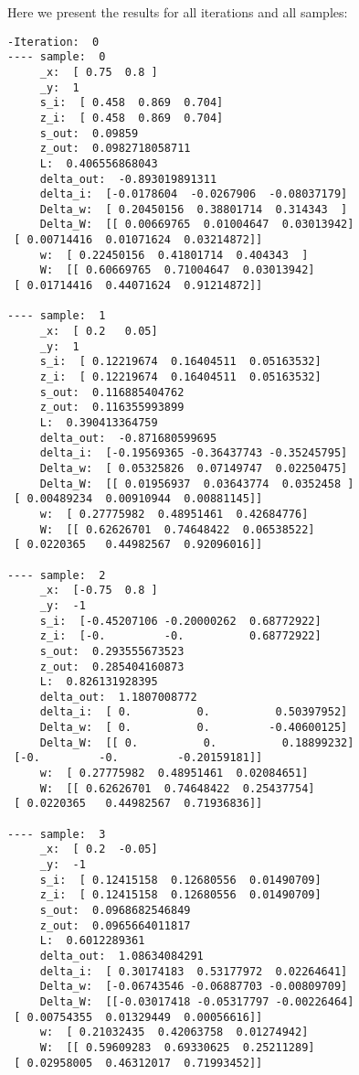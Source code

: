 \documentclass[10pt]{article}
\begin{document}
Here we present the results for all iterations and all samples:
\begin{multicols}{3}
\begin{tiny}
\begin{verbatim}
-Iteration:  0
---- sample:  0
     _x:  [ 0.75  0.8 ]
     _y:  1
     s_i:  [ 0.458  0.869  0.704]
     z_i:  [ 0.458  0.869  0.704]
     s_out:  0.09859
     z_out:  0.0982718058711
     L:  0.406556868043
     delta_out:  -0.893019891311
     delta_i:  [-0.0178604  -0.0267906  -0.08037179]
     Delta_w:  [ 0.20450156  0.38801714  0.314343  ]
     Delta_W:  [[ 0.00669765  0.01004647  0.03013942]
 [ 0.00714416  0.01071624  0.03214872]]
     w:  [ 0.22450156  0.41801714  0.404343  ]
     W:  [[ 0.60669765  0.71004647  0.03013942]
 [ 0.01714416  0.44071624  0.91214872]]

---- sample:  1
     _x:  [ 0.2   0.05]
     _y:  1
     s_i:  [ 0.12219674  0.16404511  0.05163532]
     z_i:  [ 0.12219674  0.16404511  0.05163532]
     s_out:  0.116885404762
     z_out:  0.116355993899
     L:  0.390413364759
     delta_out:  -0.871680599695
     delta_i:  [-0.19569365 -0.36437743 -0.35245795]
     Delta_w:  [ 0.05325826  0.07149747  0.02250475]
     Delta_W:  [[ 0.01956937  0.03643774  0.0352458 ]
 [ 0.00489234  0.00910944  0.00881145]]
     w:  [ 0.27775982  0.48951461  0.42684776]
     W:  [[ 0.62626701  0.74648422  0.06538522]
 [ 0.0220365   0.44982567  0.92096016]]

---- sample:  2
     _x:  [-0.75  0.8 ]
     _y:  -1
     s_i:  [-0.45207106 -0.20000262  0.68772922]
     z_i:  [-0.         -0.          0.68772922]
     s_out:  0.293555673523
     z_out:  0.285404160873
     L:  0.826131928395
     delta_out:  1.1807008772
     delta_i:  [ 0.          0.          0.50397952]
     Delta_w:  [ 0.          0.         -0.40600125]
     Delta_W:  [[ 0.          0.          0.18899232]
 [-0.         -0.         -0.20159181]]
     w:  [ 0.27775982  0.48951461  0.02084651]
     W:  [[ 0.62626701  0.74648422  0.25437754]
 [ 0.0220365   0.44982567  0.71936836]]

---- sample:  3
     _x:  [ 0.2  -0.05]
     _y:  -1
     s_i:  [ 0.12415158  0.12680556  0.01490709]
     z_i:  [ 0.12415158  0.12680556  0.01490709]
     s_out:  0.0968682546849
     z_out:  0.0965664011817
     L:  0.6012289361
     delta_out:  1.08634084291
     delta_i:  [ 0.30174183  0.53177972  0.02264641]
     Delta_w:  [-0.06743546 -0.06887703 -0.00809709]
     Delta_W:  [[-0.03017418 -0.05317797 -0.00226464]
 [ 0.00754355  0.01329449  0.00056616]]
     w:  [ 0.21032435  0.42063758  0.01274942]
     W:  [[ 0.59609283  0.69330625  0.25211289]
 [ 0.02958005  0.46312017  0.71993452]]


\end{verbatim}
\end{tiny}
\end{multicols}
\end{document}
